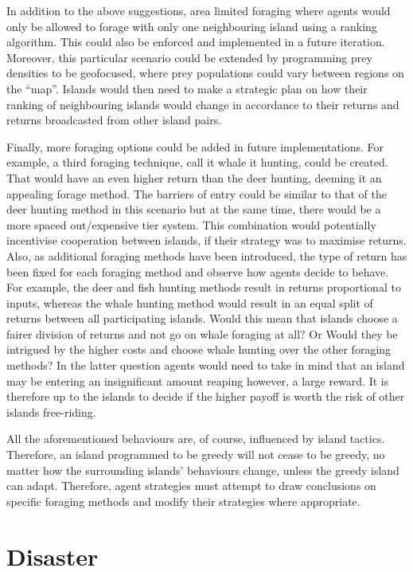 In addition to the above suggestions, area limited foraging where agents would only be allowed to forage with only one neighbouring island using a ranking algorithm. This could also be enforced and implemented in a future iteration. Moreover, this particular scenario could be extended by programming prey densities to be geofocused, where prey populations could vary between regions on the “map”. Islands would then need to make a strategic plan on how their ranking of neighbouring islands would change in accordance to their returns and returns broadcasted from other island pairs.

Finally, more foraging options could be added in future implementations. For example, a third foraging technique, call it whale it hunting, could be created. That would have an even higher return than the deer hunting, deeming it an appealing forage method. The barriers of entry could be similar to that of the deer hunting method in this scenario but at the same time, there would be a more spaced out/expensive tier system. This combination would potentially incentivise cooperation between islands, if their strategy was to maximise returns. Also, as additional foraging methods have been introduced, the type of return has been fixed for each foraging method and observe how agents decide to behave. For example, the deer and fish hunting methods result in returns proportional to inputs, whereas the whale hunting method would result in an equal split of returns between all participating islands. Would this mean that islands choose a fairer division of returns and not go on whale foraging at all? Or Would they be intrigued by the higher costs and choose whale hunting over the other foraging methods? In the latter question agents would need to take in mind that an island may be entering an insignificant amount reaping however, a large reward. It is therefore up to the islands to decide if the higher payoff is worth the risk of other islands free-riding.

All the aforementioned behaviours are, of course, influenced by island tactics. Therefore, an island programmed to be greedy will not cease to be greedy, no matter how the surrounding islands’ behaviours change, unless the greedy island can adapt. Therefore, agent strategies must attempt to draw conclusions on specific foraging methods and modify their strategies where appropriate.

\section{Disaster}
